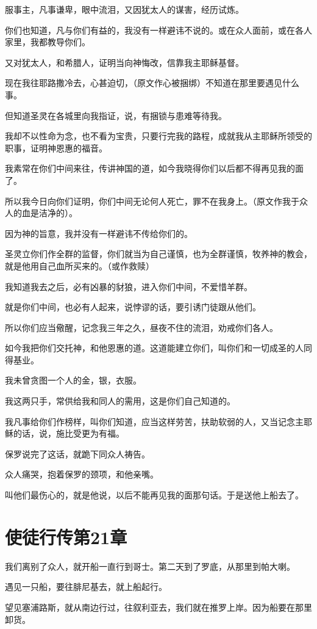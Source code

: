 \documentclass[12pt,oneside]{book}
\begin{document}
服事主，凡事谦卑，眼中流泪，又因犹太人的谋害，经历试炼。

你们也知道，凡与你们有益的，我没有一样避讳不说的。或在众人面前，或在各人家里，我都教导你们。

又对犹太人，和希腊人，证明当向神悔改，信靠我主耶稣基督。

现在我往耶路撒冷去，心甚迫切，（原文作心被捆绑）不知道在那里要遇见什么事。

但知道圣灵在各城里向我指证，说，有捆锁与患难等待我。

我却不以性命为念，也不看为宝贵，只要行完我的路程，成就我从主耶稣所领受的职事，证明神恩惠的福音。

我素常在你们中间来往，传讲神国的道，如今我晓得你们以后都不得再见我的面了。

所以我今日向你们证明，你们中间无论何人死亡，罪不在我身上。（原文作我于众人的血是洁净的）。

因为神的旨意，我并没有一样避讳不传给你们的。

圣灵立你们作全群的监督，你们就当为自己谨慎，也为全群谨慎，牧养神的教会，就是他用自己血所买来的。（或作救赎）

我知道我去之后，必有凶暴的豺狼，进入你们中间，不爱惜羊群。

就是你们中间，也必有人起来，说悖谬的话，要引诱门徒跟从他们。

所以你们应当儆醒，记念我三年之久，昼夜不住的流泪，劝戒你们各人。

如今我把你们交托神，和他恩惠的道。这道能建立你们，叫你们和一切成圣的人同得基业。

我未曾贪图一个人的金，银，衣服。

我这两只手，常供给我和同人的需用，这是你们自己知道的。

我凡事给你们作榜样，叫你们知道，应当这样劳苦，扶助软弱的人，又当记念主耶稣的话，说，施比受更为有福。

保罗说完了这话，就跪下同众人祷告。

众人痛哭，抱着保罗的颈项，和他亲嘴。

叫他们最伤心的，就是他说，以后不能再见我的面那句话。于是送他上船去了。

\chapter{使徒行传第21章}
我们离别了众人，就开船一直行到哥士。第二天到了罗底，从那里到帕大喇。

遇见一只船，要往腓尼基去，就上船起行。

望见塞浦路斯，就从南边行过，往叙利亚去，我们就在推罗上岸。因为船要在那里卸货。
\end{document}
